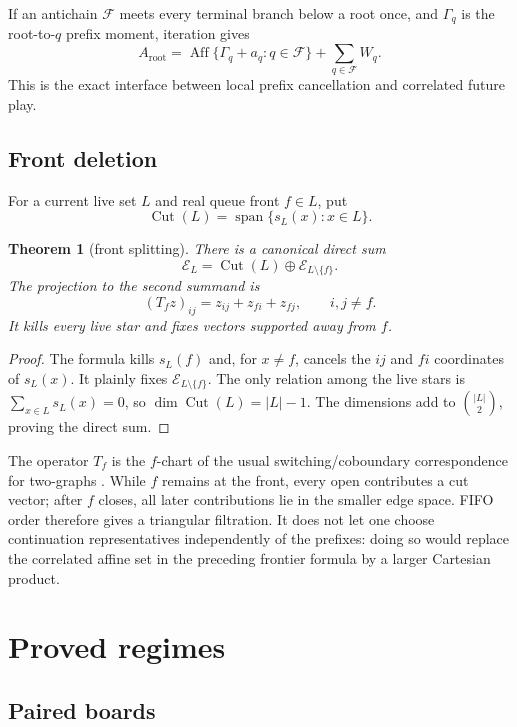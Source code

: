 \documentclass[11pt]{article}
\newtheorem{theorem}{Theorem}[section]
\theoremstyle{definition}
\theoremstyle{remark}
\begin{document}
If an antichain $\mathcal F$ meets every terminal branch below a root once,
and $\Gamma_q$ is the root-to-$q$ prefix moment, iteration gives
\[
  A_{\mathrm{root}}=
  \operatorname{Aff}\{\Gamma_q+a_q:q\in\mathcal F\}
  +\sum_{q\in\mathcal F}W_q.
\]
This is the exact interface between local prefix cancellation and correlated
future play.

\subsection{Front deletion}

For a current live set $L$ and real queue front $f\in L$, put
\[
  \operatorname{Cut}(L)=\operatorname{span}\{s_L(x):x\in L\}.
\]

\begin{theorem}[front splitting]\label{thm:front}
There is a canonical direct sum
\[
  \mathcal E_L=\operatorname{Cut}(L)\oplus
  \mathcal E_{L\setminus\{f\}}.
\]
The projection to the second summand is
\[
  (T_fz)_{ij}=z_{ij}+z_{fi}+z_{fj},
  \qquad i,j\ne f.
\]
It kills every live star and fixes vectors supported away from $f$.
\end{theorem}

\begin{proof}
The formula kills $s_L(f)$ and, for $x\ne f$, cancels the $ij$ and $fi$
coordinates of $s_L(x)$.  It plainly fixes
$\mathcal E_{L\setminus\{f\}}$.  The only relation among the live stars is
$\sum_{x\in L}s_L(x)=0$, so
$\dim\operatorname{Cut}(L)=|L|-1$.  The dimensions add to
$\binom{|L|}{2}$, proving the direct sum.
\end{proof}

The operator $T_f$ is the $f$-chart of the usual switching/coboundary
correspondence for two-graphs \cite{mallows1975}.  While $f$ remains at the
front, every open contributes a cut vector; after $f$ closes, all later
contributions lie in the smaller edge space.  FIFO order therefore gives a
triangular filtration.  It does not let one choose continuation
representatives independently of the prefixes: doing so would replace the
correlated affine set in the preceding frontier formula by a larger Cartesian product.

\section{Proved regimes}\label{sec:proved}

\subsection{Paired boards}
\end{document}
